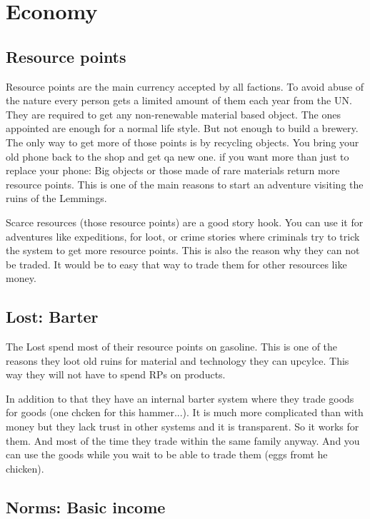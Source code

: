 \chapter{Economy}

\section{Resource points}
\label{sec:Resource points}
Resource points are the main currency accepted by all factions. To avoid abuse of the nature every person gets a limited amount of them each year from the UN. They are required to get any non-renewable material based object. The ones appointed are enough for a normal life style. But not enough to build a brewery. The only way to get more of those points is by recycling objects. You bring your old phone back to the shop and get qa new one. if you want more than just to replace your phone: Big objects or those made of rare materials return more resource points. This is one of the main reasons to start an adventure visiting the ruins of the Lemmings. 

\begin{reason}[]
    Scarce resources (those resource points) are a good story hook. You can use it for adventures like expeditions, for loot, or crime stories where criminals try to trick the system to get more resource points. This is also the reason why they can not be traded. It would be to easy that way to trade them for other resources like money.
\end{reason}

\section{Lost: Barter}
\label{sec:Barter}
The Lost spend most of their resource points on gasoline. This is one of the reasons they loot old ruins for material and technology they can upcylce. This way they will not have to spend RPs on products.

In addition to that they have an internal barter system where they trade goods for goods (one chcken for this hammer...).
It is much more complicated than with money but they lack trust in other systems and it is transparent. So it works for them. And most of the time they trade within the same family anyway.
And you can use the goods while you wait to be able to trade them (eggs fromt he chicken).


\section{Norms: Basic income}
\label{sec:basic income}

